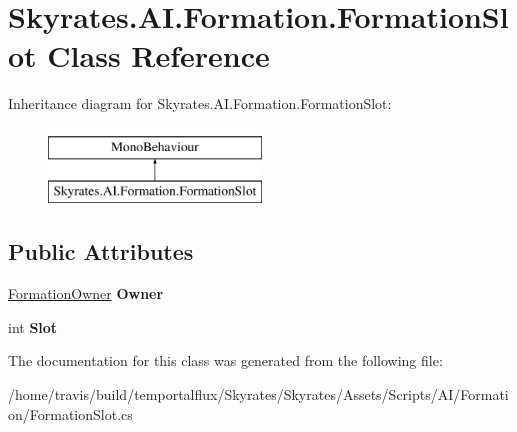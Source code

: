 \hypertarget{class_skyrates_1_1_a_i_1_1_formation_1_1_formation_slot}{\section{Skyrates.\-A\-I.\-Formation.\-Formation\-Slot Class Reference}
\label{class_skyrates_1_1_a_i_1_1_formation_1_1_formation_slot}
}
Inheritance diagram for Skyrates.\-A\-I.\-Formation.\-Formation\-Slot\-:\begin{figure}[H]
\begin{center}
\leavevmode
\includegraphics[height=2.000000cm]{class_skyrates_1_1_a_i_1_1_formation_1_1_formation_slot}
\end{center}
\end{figure}
\subsection*{Public Attributes}
\begin{DoxyCompactItemize}
\item 
\hypertarget{class_skyrates_1_1_a_i_1_1_formation_1_1_formation_slot_a5a4d184b37497fb141aa863c6b255e0f}{\hyperlink{class_skyrates_1_1_a_i_1_1_formation_1_1_formation_owner}{Formation\-Owner} {\bfseries Owner}}\label{class_skyrates_1_1_a_i_1_1_formation_1_1_formation_slot_a5a4d184b37497fb141aa863c6b255e0f}

\item 
\hypertarget{class_skyrates_1_1_a_i_1_1_formation_1_1_formation_slot_a5402c23b6120b3c62294be4c0bd8757f}{int {\bfseries Slot}}\label{class_skyrates_1_1_a_i_1_1_formation_1_1_formation_slot_a5402c23b6120b3c62294be4c0bd8757f}

\end{DoxyCompactItemize}


The documentation for this class was generated from the following file\-:\begin{DoxyCompactItemize}
\item 
/home/travis/build/temportalflux/\-Skyrates/\-Skyrates/\-Assets/\-Scripts/\-A\-I/\-Formation/Formation\-Slot.\-cs\end{DoxyCompactItemize}
